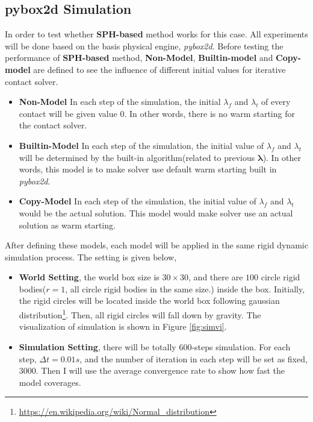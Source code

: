 \subsection{\textbf{pybox2d} Simulation}
    \label{sph:exp}
    In order to test whether \textbf{SPH-based} method works for this case. All experiments will be done based on the basis physical engine, \textit{pybox2d}. Before testing the performance of \textbf{SPH-based} method, \textbf{Non-Model}, \textbf{Builtin-model} and \textbf{Copy-model} are defined to see the influence of different initial values for iterative contact solver.
    \begin{itemize}
        \item \textbf{Non-Model} In each step of the simulation, the initial $\lambda_{f}$ and $\lambda_{t}$ of every contact will be given value $0$. In other words, there is no warm starting for the contact solver.
        \item \textbf{Builtin-Model} In each step of the simulation, the initial value of $\lambda_f$ and $\lambda_{t}$ will be determined by the built-in algorithm(related to previous $\pmb{\lambda}$). In other words, this model is to make solver use default warm starting built in \textit{pybox2d}.
        \item \textbf{Copy-Model} In each step of the simulation, the initial value of $\lambda_f$ and $\lambda_t$ would be the actual solution. This model would make solver use an actual solution as warm starting.
    \end{itemize}
    After defining these models, each model will be applied in the same rigid dynamic simulation process. The setting is given below,
    \begin{itemize}
        \item \textbf{World Setting}, the world box size is $30\times30$,   and there are $100$ circle rigid bodies($r=1$, all circle rigid bodies in the same size.) inside the box. Initially, the rigid circles will be located inside the world box following gaussian distribution\footnote{\url{https://en.wikipedia.org/wiki/Normal_distribution}}. Then, all rigid circles will fall down by gravity. The visualization of simulation is shown in Figure \ref{fig:simvi}.
        \item \textbf{Simulation Setting}, there will be totally $600$-steps simulation. For each step, $\Delta t = 0.01s$, and the number of iteration in each step will be set as fixed, $3000$. Then I will use the average convergence rate to show how fast the model coverages.
    \end{itemize}
